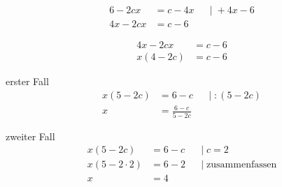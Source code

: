 \begin{align*}
6-2cx  &= c-4x &&|\;+4x-6 \\
4x-2cx &= c-6
\end{align*}

\begin{align*}
4x-2cx  &= c-6 \\
x(4-2c) &= c-6
\end{align*}

erster Fall
\begin{align*}
x(5-2c) &= 6-c &&|\;:(5-2c) \\
      x &= \frac{6-c}{5-2c}
\end{align*}

zweiter Fall
\begin{align*}
x(5-2c) &= 6-c && |\;c=2 \\
x(5-2\cdot 2) &= 6-2 && |\;\text{zusammenfassen} \\
x &= 4
\end{align*}
